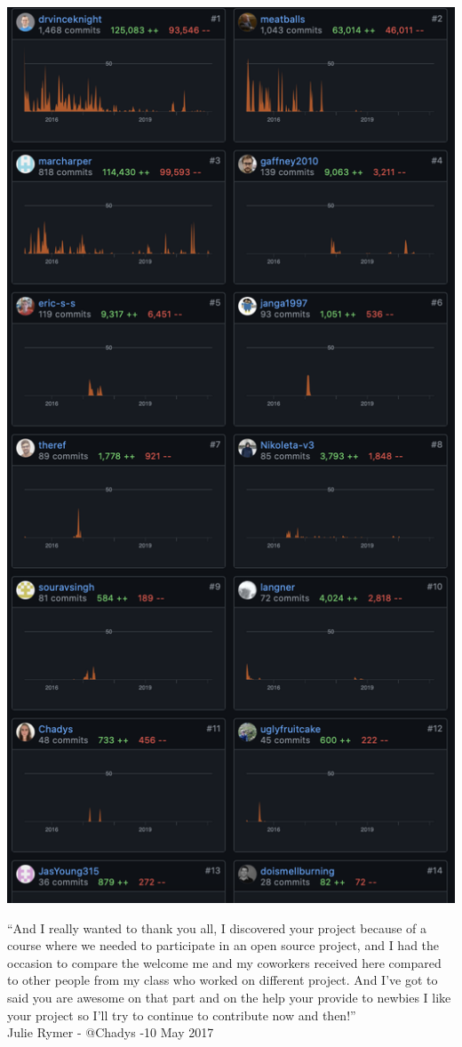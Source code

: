 \documentclass{beamer}
\begin{document}
\begin{frame}
    \centering
    \includegraphics[width=.40\textwidth]{static/contributions.png}
\end{frame}

\begin{frame}
    \footnotesize
    ``And I really wanted to thank you all, I discovered your project because of a
    course where we needed to participate in an open source project, and I had
    the occasion to compare the welcome me and my coworkers received here
    compared to other people from my class who worked on different project. And
    I’ve got to said you are awesome on that part and on the help your provide
    to newbies I like your project so I’ll try to continue to contribute now and
    then!'' \\

    Julie Rymer - @Chadys -10 May 2017
\end{frame}
\end{document}
